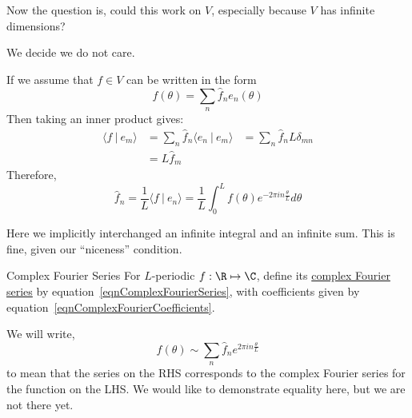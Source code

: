 \documentclass[../Main.tex]{subfiles}
\begin{document}
Now the question is, could this work on $V$, especially because $V$ has infinite dimensions?

We decide we do not care.

If we assume that $f \in V$ can be written in the form
\begin{equation}
    f(\theta) = \sum_n \hat{f}_n e_n(\theta)
    \label{eqnComplexFourierSeries}
\end{equation}
Then taking an inner product gives:
\begin{align*}
    \langle f~|~e_m\rangle &= \sum_n \hat{f}_n \langle e_n~|~e_m\rangle
    &= \sum_n \hat{f}_n L\delta_{mn} \\
    &= L\hat{f}_m
\end{align*}
Therefore,
\begin{equation}
    \hat{f}_n = \frac{1}{L}\langle f~|~e_n\rangle = \frac{1}{L} \int_0^L f(\theta) e^{-2\pi in\frac{\theta}{L}}d\theta
    \label{eqnComplexFourierCoefficients}
\end{equation}
\begin{warning}
    Here we implicitly interchanged an infinite integral and an infinite sum. This is fine, given our ``niceness'' condition.
\end{warning}
\begin{definition}{Complex Fourier Series}
    For $L$-periodic $f : \R \mapsto \C$, define its \underline{complex Fourier series} by equation~\ref{eqnComplexFourierSeries}, with coefficients given by equation~\ref{eqnComplexFourierCoefficients}.
\end{definition}
We will write,
\begin{equation*}
    f(\theta) \sim \sum_n \hat{f}_n e^{2\pi i n \frac{\theta}{L}}
\end{equation*}
to mean that the series on the RHS corresponds to the complex Fourier series for the function on the LHS. We would like to demonstrate equality here, but we are not there yet.
\end{document}

